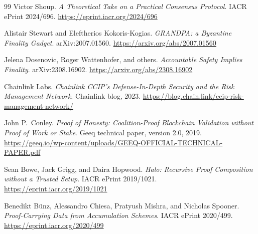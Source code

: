 \documentclass[11pt]{article}
\begin{document}
\begin{thebibliography}{99}
Victor Shoup.
\newblock \emph{A Theoretical Take on a Practical Consensus Protocol}.
\newblock IACR ePrint 2024/696.
\newblock \url{https://eprint.iacr.org/2024/696}

Alistair Stewart and Eleftherios Kokoris-Kogias.
\newblock \emph{GRANDPA: a Byzantine Finality Gadget}.
\newblock arXiv:2007.01560.
\newblock \url{https://arxiv.org/abs/2007.01560}

Jelena Dosenovic, Roger Wattenhofer, and others.
\newblock \emph{Accountable Safety Implies Finality}.
\newblock arXiv:2308.16902.
\newblock \url{https://arxiv.org/abs/2308.16902}

Chainlink Labs.
\newblock \emph{Chainlink CCIP's Defense-In-Depth Security and the Risk
Management Network}.
\newblock Chainlink blog, 2023.
\newblock \url{https://blog.chain.link/ccip-risk-management-network/}

John P.~Conley.
\newblock \emph{Proof of Honesty: Coalition-Proof Blockchain Validation without
Proof of Work or Stake}.
\newblock Geeq technical paper, version 2.0, 2019.
\newblock \url{https://geeq.io/wp-content/uploads/GEEQ-OFFICIAL-TECHNICAL-PAPER.pdf}

Sean Bowe, Jack Grigg, and Daira Hopwood.
\newblock \emph{Halo: Recursive Proof Composition without a Trusted Setup}.
\newblock IACR ePrint 2019/1021.
\newblock \url{https://eprint.iacr.org/2019/1021}

Benedikt B{\"u}nz, Alessandro Chiesa, Pratyush Mishra, and Nicholas Spooner.
\newblock \emph{Proof-Carrying Data from Accumulation Schemes}.
\newblock IACR ePrint 2020/499.
\newblock \url{https://eprint.iacr.org/2020/499}

\end{thebibliography}
\end{document}
